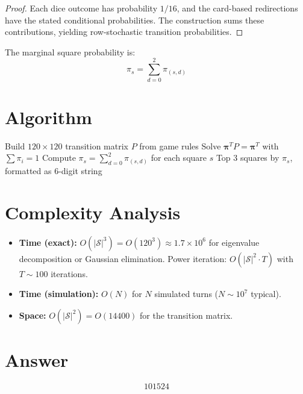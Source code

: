 \documentclass[12pt]{article}
\begin{document}
\begin{proof}
Each dice outcome has probability $1/16$, and the card-based redirections have the stated conditional probabilities. The construction sums these contributions, yielding row-stochastic transition probabilities.
\end{proof}

The marginal square probability is:
\[
\pi_s = \sum_{d=0}^{2} \pi_{(s,d)}
\]

\section{Algorithm}

\begin{algorithm}[H]
\caption{Monopoly Stationary Distribution}
\begin{algorithmic}[1]
\STATE Build $120 \times 120$ transition matrix $P$ from game rules
\STATE Solve $\boldsymbol{\pi}^T P = \boldsymbol{\pi}^T$ with $\sum \pi_i = 1$
\STATE Compute $\pi_s = \sum_{d=0}^{2} \pi_{(s,d)}$ for each square $s$
\RETURN Top 3 squares by $\pi_s$, formatted as 6-digit string
\end{algorithmic}
\end{algorithm}

\section{Complexity Analysis}

\begin{itemize}
    \item \textbf{Time (exact):} $O(|\mathcal{S}|^3) = O(120^3) \approx 1.7 \times 10^6$ for eigenvalue decomposition or Gaussian elimination. Power iteration: $O(|\mathcal{S}|^2 \cdot T)$ with $T \sim 100$ iterations.
    \item \textbf{Time (simulation):} $O(N)$ for $N$ simulated turns ($N \sim 10^7$ typical).
    \item \textbf{Space:} $O(|\mathcal{S}|^2) = O(14400)$ for the transition matrix.
\end{itemize}

\section{Answer}

\[
\boxed{101524}
\]
\end{document}
